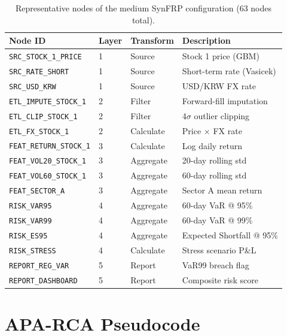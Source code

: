 \documentclass{article}
\begin{document}
\begin{table}[h]
  \centering
  \caption{Representative nodes of the medium SynFRP configuration (63 nodes total).}
  \label{tab:catalog}
  \small
  \begin{tabular}{llll}
    \toprule
    Node ID & Layer & Transform & Description \\
    \midrule
    \texttt{SRC\_STOCK\_1\_PRICE}     & 1 & Source    & Stock 1 price (GBM) \\
    \texttt{SRC\_RATE\_SHORT}          & 1 & Source    & Short-term rate (Vasicek) \\
    \texttt{SRC\_USD\_KRW}             & 1 & Source    & USD/KRW FX rate \\
    \texttt{ETL\_IMPUTE\_STOCK\_1}     & 2 & Filter    & Forward-fill imputation \\
    \texttt{ETL\_CLIP\_STOCK\_1}       & 2 & Filter    & 4$\sigma$ outlier clipping \\
    \texttt{ETL\_FX\_STOCK\_1}         & 2 & Calculate & Price $\times$ FX rate \\
    \texttt{FEAT\_RETURN\_STOCK\_1}    & 3 & Calculate & Log daily return \\
    \texttt{FEAT\_VOL20\_STOCK\_1}     & 3 & Aggregate & 20-day rolling std \\
    \texttt{FEAT\_VOL60\_STOCK\_1}     & 3 & Aggregate & 60-day rolling std \\
    \texttt{FEAT\_SECTOR\_A}           & 3 & Aggregate & Sector A mean return \\
    \texttt{RISK\_VAR95}               & 4 & Aggregate & 60-day VaR @ 95\% \\
    \texttt{RISK\_VAR99}               & 4 & Aggregate & 60-day VaR @ 99\% \\
    \texttt{RISK\_ES95}                & 4 & Aggregate & Expected Shortfall @ 95\% \\
    \texttt{RISK\_STRESS}              & 4 & Calculate & Stress scenario P\&L \\
    \texttt{REPORT\_REG\_VAR}          & 5 & Report    & VaR99 breach flag \\
    \texttt{REPORT\_DASHBOARD}         & 5 & Report    & Composite risk score \\
    \bottomrule
  \end{tabular}
\end{table}

\section{APA-RCA Pseudocode}
\label{app:pseudocode}
\end{document}
